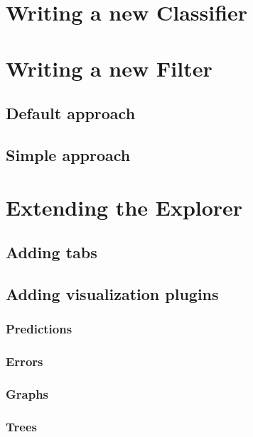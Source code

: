 %
%
%
%


\section{Writing a new Classifier}

\section{Writing a new Filter}

\subsection{Default approach}

\subsection{Simple approach}

\section{Extending the Explorer}

\subsection{Adding tabs}

\subsection{Adding visualization plugins}

\subsubsection*{Predictions}

\subsubsection*{Errors}

\subsubsection*{Graphs}

\subsubsection*{Trees}
